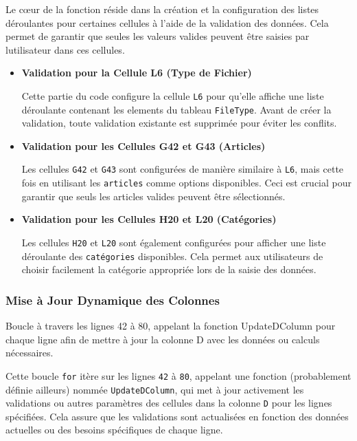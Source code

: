 \documentclass[a4paper, oneside, 12pt, final]{extreport}
\begin{document}
Le cœur de la fonction réside dans la création et la configuration des listes déroulantes pour certaines cellules à l'aide de la validation des données. Cela permet de garantir que seules les valeurs valides peuvent être saisies par lutilisateur dans ces cellules.

\begin{itemize}


\item \textbf{Validation pour la Cellule L6 (Type de Fichier)}



Cette partie du code configure la cellule \texttt{L6} pour qu'elle affiche une liste déroulante contenant les elements du tableau \texttt{FileType}. Avant de créer la validation, toute validation existante est supprimée pour éviter les conflits.

\item \textbf{Validation pour les Cellules G42 et G43 (Articles)}


Les cellules \texttt{G42} et \texttt{G43} sont configurées de manière similaire à \texttt{L6}, mais cette fois en utilisant les \texttt{articles} comme options disponibles. Ceci est crucial pour garantir que seuls les articles valides peuvent être sélectionnés.

\item \textbf{Validation pour les Cellules H20 et L20 (Catégories)}




Les cellules \texttt{H20} et \texttt{L20} sont également configurées pour afficher une liste déroulante des \texttt{catégories} disponibles. Cela permet aux utilisateurs de choisir facilement la catégorie appropriée lors de la saisie des données.

\end{itemize}
\subsubsection{Mise à Jour Dynamique des Colonnes}

Boucle à travers les lignes 42 à 80, appelant la fonction UpdateDColumn pour chaque ligne afin de mettre à jour la colonne D avec les données ou calculs nécessaires.

Cette boucle \texttt{for} itère sur les lignes \texttt{42} à \texttt{80}, appelant une fonction (probablement définie ailleurs) nommée \texttt{UpdateDColumn}, qui met à jour activement les validations ou autres paramètres des cellules dans la colonne \texttt{D} pour les lignes spécifiées. Cela assure que les validations sont actualisées en fonction des données actuelles ou des besoins spécifiques de chaque ligne.
\end{document}

